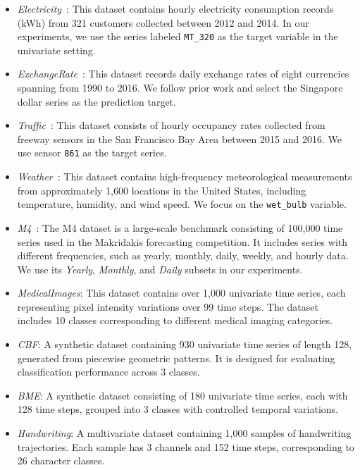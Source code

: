 \documentclass{article}
\begin{document}
\begin{itemize}

\item \textit{Electricity}~\citep{trindade2015electricityloaddiagrams20112014}: This dataset contains hourly electricity consumption records (kWh) from 321 customers collected between 2012 and 2014. In our experiments, we use the series labeled \texttt{MT\_320} as the target variable in the univariate setting.

\item \textit{ExchangeRate}~\citep{lai2018modeling}: This dataset records daily exchange rates of eight currencies spanning from 1990 to 2016. We follow prior work and select the Singapore dollar series as the prediction target.

\item \textit{Traffic}~\citep{traffic_data}: This dataset consists of hourly occupancy rates collected from freeway sensors in the San Francisco Bay Area between 2015 and 2016. We use sensor \texttt{861} as the target series.

\item \textit{Weather}~\citep{weather_data}: This dataset contains high-frequency meteorological measurements from approximately 1,600 locations in the United States, including temperature, humidity, and wind speed. We focus on the \texttt{wet\_bulb} variable.

\item \textit{M4}~\citep{makridakis2018m4}: The M4 dataset is a large-scale benchmark consisting of 100,000 time series used in the Makridakis forecasting competition. It includes series with different frequencies, such as yearly, monthly, daily, weekly, and hourly data. We use its \textit{Yearly}, \textit{Monthly}, and \textit{Daily} subsets in our experiments.

\item \textit{MedicalImages}: This dataset contains over 1,000 univariate time series, each representing pixel intensity variations over 99 time steps. The dataset includes 10 classes corresponding to different medical imaging categories.

\item \textit{CBF}: A synthetic dataset containing 930 univariate time series of length 128, generated from piecewise geometric patterns. It is designed for evaluating classification performance across 3 classes.

\item \textit{BME}: A synthetic dataset consisting of 180 univariate time series, each with 128 time steps, grouped into 3 classes with controlled temporal variations.

\item \textit{Handwriting}: A multivariate dataset containing 1,000 samples of handwriting trajectories. Each sample has 3 channels and 152 time steps, corresponding to 26 character classes.

\end{itemize}
\end{document}
